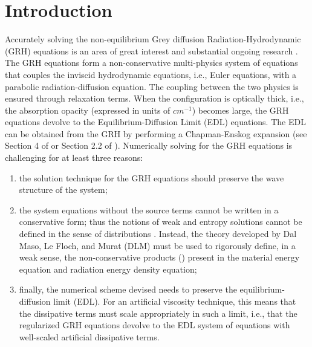 \documentclass[times,doublespace]{fldauth}%
\begin{document}

\maketitle

%
\section{Introduction}
\label{sec:intro}
Accurately solving the non-equilibrium Grey diffusion Radiation-Hydrodynamic (GRH) equations is an area of great interest and substantial ongoing research \cite{Balsara,LowrieMorelHittinger,LowrieEdwards,EdwardsMorelLowrie}.
The GRH equations form a non-conservative multi-physics system of equations that couples the inviscid hydrodynamic equations, i.e., Euler equations, with a parabolic radiation-diffusion equation. 
The coupling between the two physics is ensured through relaxation terms. When the configuration is optically thick, i.e., the absorption opacity (expressed in units of $cm^{-1}$) becomes large, the GRH equations devolve to the Equilibrium-Diffusion Limit (EDL) equations. 
The EDL can be obtained from the GRH by performing a Chapman-Enskog expansion (see Section 4 of \cite{LowrieMorel} or Section 2.2 of \cite{our_jcp_radhy_paper}).
Numerically solving for the GRH equations is challenging for at least three reasons: 
\begin{enumerate}
\item
the solution technique for the GRH equations should preserve the wave structure of the system; 
\item
the system equations without the source terms cannot be written in a conservative form; thus the notions of weak and entropy solutions cannot be defined in the sense of distributions \cite{dlm, lefloch_1988, lefloch_1989, lefloch_liu_1993, bianchini_bressan_2005}.  Instead, the theory developed by Dal Maso, Le Floch, and Murat (DLM) must be used to rigorously define, in a weak sense, the non-conservative products (\cite{dlm}) present in the material energy equation and radiation energy density equation;
\item
finally, the numerical scheme devised needs to preserve the equilibrium-diffusion limit (EDL). For an artificial viscosity technique, this means that the dissipative terms must scale appropriately in such a limit, i.e., that the regularized GRH equations 
devolve to the EDL system of equations with well-scaled artificial dissipative terms.
\end{enumerate}
\end{document}
